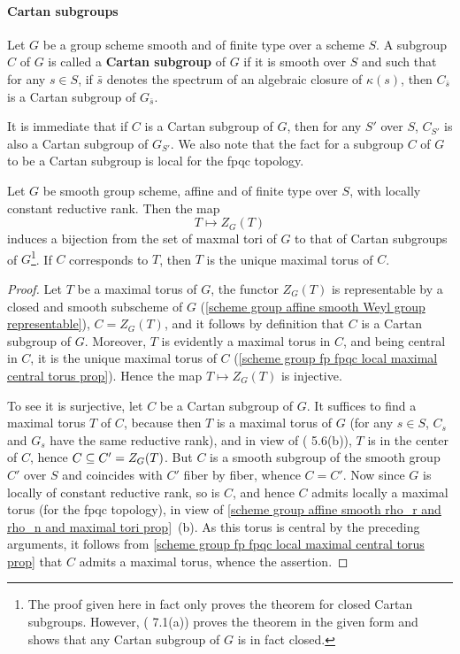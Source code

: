 \paragraph{Cartan subgroups}
\begin{definition} 
Let $G$ be a group scheme smooth and of finite type over a scheme $S$. A subgroup $C$ of $G$ is called a \textbf{Cartan subgroup} of $G$ if it is smooth over $S$ and such that for any $s\in S$, if $\bar{s}$ denotes the spectrum of an algebraic closure of $\kappa(s)$, then $C_{\bar{s}}$ is a Cartan subgroup of $G_{\bar{s}}$.
\end{definition}
It is immediate that if $C$ is a Cartan subgroup of $G$, then for any $S'$ over $S$, $C_{S'}$ is also a Cartan subgroup of $G_{S'}$. We also note that the fact for a subgroup $C$ of $G$ to be a Cartan subgroup is local for the fpqc topology.

\begin{theorem}\label{scheme smooth affine ft maximal tori and Cartan subgroup correspond}
Let $G$ be smooth group scheme, affine and of finite type over $S$, with locally constant reductive rank. Then the map
\[T\mapsto Z_G(T)\]
induces a bijection from the set of maxmal tori of $G$ to that of Cartan subgroups of $G$\footnote{The proof given here in fact only proves the theorem for closed Cartan subgroups. However, (\cite{SGA3-2}  7.1(a)) proves the theorem in the given form and shows that any Cartan subgroup of $G$ is in fact closed.}. If $C$ corresponds to $T$, then $T$ is the unique maximal torus of $C$.
\end{theorem}
\begin{proof}
Let $T$ be a maximal torus of $G$, the functor $Z_G(T)$ is representable by a closed and smooth subscheme of $G$ (\cref{scheme group affine smooth Weyl group representable}), $C=Z_G(T)$, and it follows by definition that $C$ is a Cartan subgroup of $G$. Moreover, $T$ is evidently a maximal torus in $C$, and being central in $C$, it is the unique maximal torus of $C$ (\cref{scheme group fp fpqc local maximal central torus prop}). Hence the map $T\mapsto Z_G(T)$ is injective.\par
To see it is surjective, let $C$ be a Cartan subgroup of $G$. It suffices to find a maximal torus $T$ of $C$, because then $T$ is a maximal torus of $G$ (for any $s\in S$, $C_s$ and $G_s$ have the same reductive rank), and in view of (\cite{SGA3-1}  5.6(b)), $T$ is in the center of $C$, hence $C\subseteq C'=Z_G(T)$. But $C$ is a smooth subgroup of the smooth group $C'$ over $S$ and coincides with $C'$ fiber by fiber, whence $C=C'$. Now since $G$ is locally of constant reductive rank, so is $C$, and hence $C$ admits locally a maximal torus (for the fpqc topology), in view of \cref{scheme group affine smooth rho_r and rho_n and maximal tori prop}~(b). As this torus is central by the preceding arguments, it follows from \cref{scheme group fp fpqc local maximal central torus prop} that $C$ admits a maximal torus, whence the assertion.
\end{proof}

